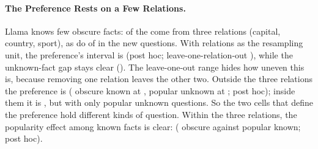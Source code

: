 \documentclass[manuscript,screen,review,anonymous,nonacm]{acmart}
\begin{document}
\paragraph{The Preference Rests on a Few Relations.} Llama knows few obscure facts: \rcTopThree{} of the \gsObsKnownTotal{} come from three relations (capital, country, sport), as do \nqTopThree{} of \nqObsKnownN{} in the new questions. With relations as the resampling unit, the preference's interval is \rcClusCI{} (post hoc; leave-one-relation-out \rcLoro), while the unknown-fact gap stays clear (\rcUnkClusCI). The leave-one-out range hides how uneven this is, because removing one relation leaves the other two. Outside the three relations the preference is \msOutDiff{} \msOutDiffCI{} (\msOutKnownN{} obscure known at \msOutKnownRate, \msOutUnkN{} popular unknown at \msOutUnkRate; post hoc); inside them it is \msInDiff{} \msInDiffCI, but with only \msInUnkN{} popular unknown questions. So the two cells that define the preference hold different kinds of question. Within the three relations, the popularity effect among known facts is clear: \msKnownGap{} \msKnownGapCI{} (\msInKnownN{} obscure against \msKnownPopN{} popular known; post hoc).
\end{document}
